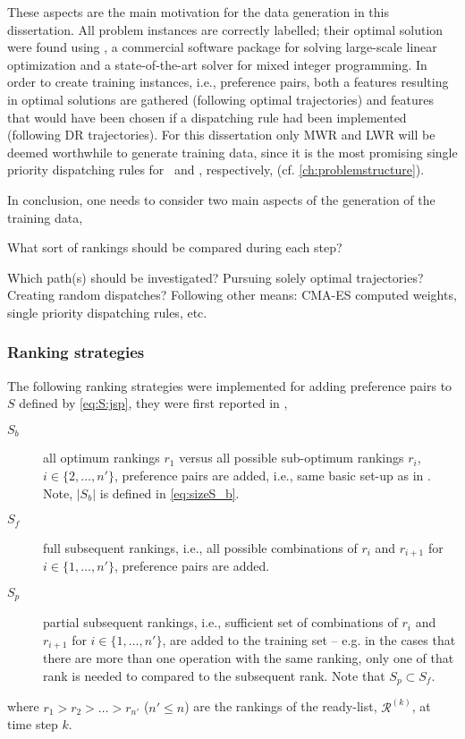 These aspects are the main motivation for the data generation in this dissertation. All problem instances are correctly labelled; their optimal solution were found using \cite{gurobi}, a commercial software package for solving large-scale linear optimization and a state-of-the-art solver for mixed integer programming. In order to create training instances, i.e., preference pairs, both a features resulting in optimal solutions are gathered (following optimal trajectories) and features that would have been chosen if a dispatching rule had been implemented (following DR trajectories). 
For this dissertation only MWR and LWR will be deemed worthwhile to generate training data, since it is the most promising single priority dispatching rules for \JSP\ and \FSP, respectively, (cf. \cref{ch:problemstructure}).

In conclusion, one needs to consider two main aspects of the generation of the training data, 
\begin{inparaenum}[(a)]
\item What sort of rankings should be compared during each step? 
\item Which path(s) should be investigated? Pursuing solely optimal trajectories? Creating random dispatches? Following other means: CMA-ES computed weights, single priority dispatching rules, etc. 
\end{inparaenum}

\subsubsection{Ranking strategies}
The following ranking strategies were implemented for adding preference pairs to $S$ defined by \cref{eq:S:jsp}, they were first reported in \citet{InRu14b},
\begin{description}
\item[$S_b$] all optimum rankings $r_1$ versus all possible sub-optimum rankings $r_i$, $i\in\{2,\ldots,n'\}$, preference pairs are added, i.e., same basic set-up as in \cite{InRu11a}. Note, $|S_b|$ is defined in \cref{eq:sizeS_b}.
\item[$S_f$] full subsequent rankings, i.e., all possible combinations of $r_i$ and $r_{i+1}$ for $i\in\{1,\ldots,n'\}$, preference pairs are added.
\item[$S_p$] partial subsequent rankings, i.e., sufficient set of combinations of $r_i$ and $r_{i+1}$ for $i\in\{1,\ldots,n'\}$, are added to the training set -- e.g. in the cases that there are more than one operation with the same ranking, only one of that rank is needed to compared to the subsequent rank. Note that $S_p\subset S_f$.
\end{description}
where $r_1>r_2>\ldots>r_{n'}$ ($n'\leq n$) are the rankings of the ready-list, $\mathcal{R}^{(k)}$, at time step $k$.


